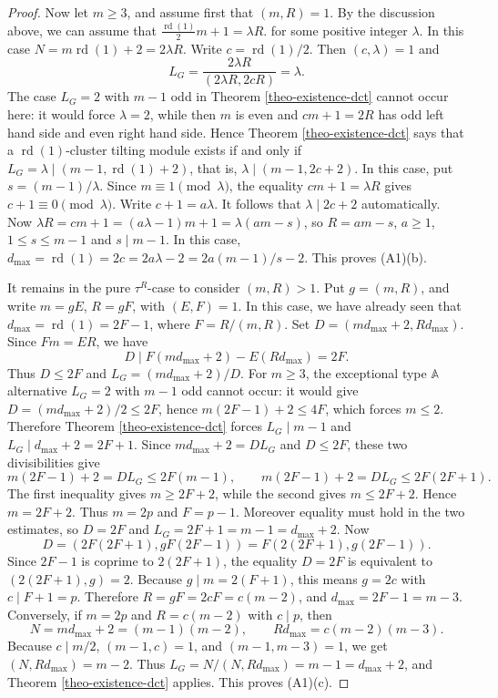 \documentclass[12pt]{article}
\theoremstyle{plain}
\theoremstyle{definition}
\DeclareMathOperator{\rd}{rd}
\renewcommand{\leq}{\leqslant}
\renewcommand{\geq}{\geqslant}
\begin{document}
\begin{proof}
Now let \(m\geq 3\), and assume first that \((m,R)=1\). By the discussion above, we can assume that 
\(\frac{\rd(1)}{2}m+1=\lambda R.
\) for some positive integer \(\lambda\). In this case $N=m\rd(1)+2=2\lambda R$. Write \(c=\rd(1)/2\). Then $(c,\lambda)=1$ and 
\[
L_G=\frac{2\lambda R}{(2\lambda R,2cR)}=\lambda .
\]
The case \(L_G=2\) with \(m-1\) odd in Theorem
\ref{theo-existence-dct} cannot occur here: it would force
\(\lambda=2\), while then \(m\) is even and \(cm+1=2R\) has odd left hand
side and even right hand side. Hence Theorem \ref{theo-existence-dct} says that a \(\rd(1)\)-cluster tilting module exists if and only if   \(L_G=\lambda\mid (m-1,\rd(1)+2)\), that is, \(\lambda\mid (m-1,2c+2)\). In this case, put \(s=(m-1)/\lambda\).  Since
\(m\equiv1\pmod\lambda\), the equality \(cm+1=\lambda R\) gives
\(c+1\equiv0\pmod\lambda\). Write \(c+1=a\lambda\). It follows that $\lambda\mid 2c+2$ automatically. Now
\(
\lambda R=cm+1=(a\lambda-1)m+1=\lambda(am-s)
\),
so \(R=am-s\), \(a\geq 1\), \(1\leq s\leq m-1\) and \(s\mid m-1\). In this case, 
\(
d_{\max}=\rd(1)=2c=2a\lambda-2=2a(m-1)/s-2\).  This proves (A1)(b).

It remains in the pure \(\tau^R\)-case to consider \((m,R)>1\). Put
\(g=(m,R)\), and write \(m=gE\), \(R=gF\), with \((E,F)=1\). In this case,
we have already seen that \(d_{\max}=\rd(1)=2F-1\), where \(F=R/(m,R)\).
Set \(D=(md_{\max}+2,Rd_{\max})\). Since \(Fm=ER\), we have
\[
D\mid F(md_{\max}+2)-E(Rd_{\max})=2F.
\]
Thus \(D\leq 2F\) and \(L_G=(md_{\max}+2)/D\). For \(m\geq3\), the
exceptional type \(\mathbb A\) alternative \(L_G=2\) with \(m-1\) odd cannot
occur: it would give \(D=(md_{\max}+2)/2\leq2F\), hence
\(m(2F-1)+2\leq4F\), which forces \(m\leq2\). Therefore Theorem
\ref{theo-existence-dct} forces \(L_G\mid m-1\) and
\(L_G\mid d_{\max}+2=2F+1\). Since \(md_{\max}+2=DL_G\) and \(D\leq2F\),
these two divisibilities give
\[
m(2F-1)+2=DL_G\leq 
2F(m-1),\qquad
m(2F-1)+2=DL_G\leq 2F(2F+1).
\]
The first inequality gives \(m\geq2F+2\), while the second gives
\(m\leq2F+2\). Hence \(m=2F+2\). Thus \(m=2p\) and \(F=p-1\). Moreover
equality must hold in the two estimates, so \(D=2F\) and
\(L_G=2F+1=m-1=d_{\max}+2\). Now
\[
D=(2F(2F+1),gF(2F-1))=F(2(2F+1),g(2F-1)).
\]
Since \(2F-1\) is coprime to \(2(2F+1)\), the equality \(D=2F\) is
equivalent to \((2(2F+1),g)=2\). Because \(g\mid m=2(F+1)\), this means
\(g=2c\) with \(c\mid F+1=p\). Therefore
\(R=gF=2cF=c(m-2)\), and \(d_{\max}=2F-1=m-3\). Conversely, if \(m=2p\) and \(R=c(m-2)\) with
\(c\mid p\), then
\[
N=md_{\max}+2=(m-1)(m-2),\qquad Rd_{\max}=c(m-2)(m-3).
\]
Because \(c\mid m/2\), \((m-1,c)=1\), and \((m-1,m-3)=1\), we get
\((N,Rd_{\max})=m-2\).  Thus \(L_G=N/(N,Rd_{\max})=m-1=d_{\max}+2\), and Theorem
\ref{theo-existence-dct} applies.  This proves (A1)(c).   




\end{proof}
\end{document}

